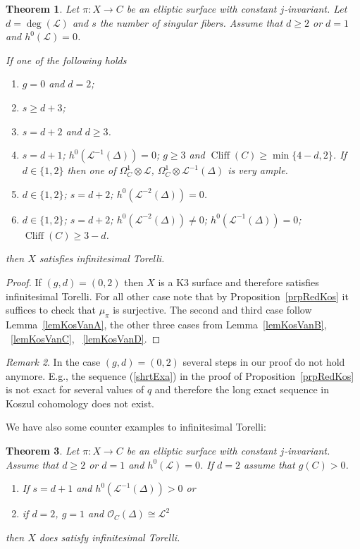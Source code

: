 \documentclass{amsart}
\newcommand{\cL}{\mathcal{L}}
\newcommand{\cO}{\mathcal{O}}
\newtheorem{theorem}{Theorem}[section]
\theoremstyle{definition}
\theoremstyle{remark}
\newtheorem{remark}[theorem]{Remark}
\DeclareMathOperator{\Cliff}{Cliff}
\begin{document}
\begin{theorem}\label{mainThmCst} Let $\pi: X \to C$ be an elliptic surface with constant $j$-invariant. Let $d=\deg(\cL)$ and $s$ the number of singular fibers. Assume that $d\geq 2$ or $d=1$ and $h^0(\cL)=0$.

If one of the following holds 
\begin{enumerate}
\item $g=0$ and $d=2$;
\item $s \geq d+3$;
\item $s=d+2$ and $d\geq 3$.
\item $s=d+1$; $h^0(\cL^{-1}(\Delta))=0$; $g\geq 3$ and $\Cliff(C)\geq \min\{4-d,2\}$. If $d\in \{1,2\}$ then one of $\Omega_C^1\otimes \cL$, $\Omega_C^1\otimes \cL^{-1}(
\Delta)$ is very ample.
\item $d\in \{1,2\}$; $s=d+2$; $h^0(\cL^{-2}(\Delta))=0$.
\item $d\in \{1,2\}$; $s=d+2$; $h^0(\cL^{-2}(\Delta))\neq 0$; $h^0(\cL^{-1}(\Delta))= 0$; $\Cliff(C)\geq 3-d$.
\end{enumerate}
then $X$ satisfies infinitesimal Torelli.
\end{theorem}

\begin{proof}
If $(g,d)=(0,2)$ then $X$ is a K3 surface and therefore satisfies infinitesimal Torelli. For all other case note that by Proposition~\ref{prpRedKos} it  suffices to check that  
$\mu_\pi$ is surjective. The second and third case follow  Lemma~\ref{lemKosVanA}, the other three cases from  Lemma~\ref{lemKosVanB}, ~\ref{lemKosVanC}, ~\ref{lemKosVanD}.
\end{proof}

\begin{remark}
In the case $(g,d)=(0,2)$ several steps in our proof do not hold anymore. E.g., the  sequence (\ref{shrtExa}) in the proof of  Proposition~\ref{prpRedKos} is not exact for several values of $q$ and therefore the long exact sequence in Koszul cohomology does not exist.
\end{remark}


We have also some counter examples to infinitesimal Torelli:
\begin{theorem}\label{ThmCounter} Let $\pi: X \to C$ be an elliptic surface with constant $j$-invariant.  Assume that $d\geq 2$ or $d=1$ and $h^0(\cL)=0$. If $d=2$ assume that $g(C)>0$.

\begin{enumerate}
\item If $s=d+1$ and $h^0(\cL^{-1}(\Delta))>0$ or
\item if $d=2$, $g=1$ and $\cO_C(\Delta)\cong\cL^2$ 
\end{enumerate}
then $X$ does satisfy infinitesimal Torelli.
\end{theorem}
\end{document}
